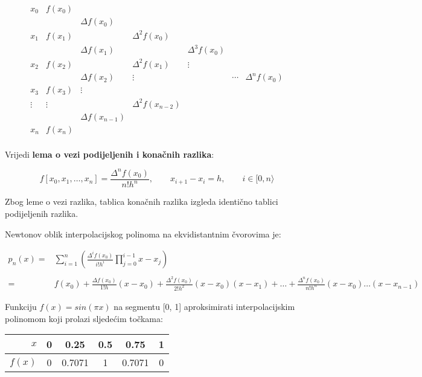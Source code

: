 \begin{tablebox}
    $$
    \begin{array}{ccccccc}
        x_0 & f(x_0) \\
        & & \Delta f(x_0) \\
        x_1 & f(x_1) & & \Delta^2 f(x_0) \\
        & & \Delta f(x_1) & & \Delta^3 f(x_0) \\
        x_2 & f(x_2) & & \Delta^2 f(x_1) & \vdots \\
        & & \Delta f(x_2) & \vdots & & \cdots & \Delta^n f(x_0) \\
        x_3 & f(x_3) & \vdots \\
        \vdots & \vdots & & \Delta^2 f(x_{n-2}) \\
        & & \Delta f(x_{n-1}) \\
        x_n & f(x_n) \\
    \end{array}
    $$
\end{tablebox}

Vrijedi \textbf{lema o vezi podijeljenih i konačnih razlika}:

$$
f[x_0,x_1,\dots,x_n] = \frac{\Delta^nf(x_0)}{n!h^n},\qquad x_{i+1}-x_i=h,\qquad i\in [0,n\rangle
$$

Zbog leme o vezi razlika, tablica konačnih razlika izgleda identično tablici podijeljenih razlika.

Newtonov oblik interpolacijskog polinoma na ekvidistantnim čvorovima je:

\begin{align}
p_n(x) =& \sum_{i=1}^{n}\left(\frac{\Delta^if(x_0)}{i!h^i}\prod_{j=0}^{i-1}x-x_j\right)\\\nonumber\\
=&f(x_0)
+\frac{\Delta f(x_0)}{1!h}(x-x_0)
+\frac{\Delta^2 f(x_0)}{2!h^2}(x-x_0)(x-x_1)
+\dots
+\frac{\Delta^n f(x_0)}{n!h^n}(x-x_0)\dots(x-x_{n-1})\nonumber
\end{align}

\newpage

\begin{example}
    Funkciju $f(x)=sin(\pi x)$ na segmentu [0, 1] aproksimirati interpolacijskim polinomom koji prolazi sljedećim točkama:

    \center
    \begin{tabular}{r|c|c|c|c|c}
        $x$ & 0 & 0.25 & 0.5 & 0.75 & 1\\
        \hline
        $f(x)$ & 0 & 0.7071 & 1 & 0.7071 & 0
    \end{tabular}
\end{example}

